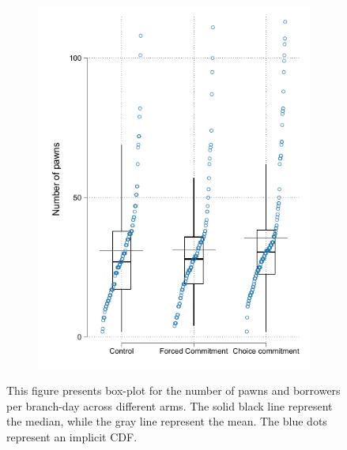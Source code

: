 \begin{figure}[H]
\begin{center}
\begin{subfigure}{0.35\textwidth}
        \includegraphics[width=\textwidth]{Figuras/box_plot_num_pawns.pdf}
    \end{subfigure}
    \end{center}
    \scriptsize
        This figure presents box-plot for the number of pawns and borrowers per branch-day across different arms. The solid black line represent the median, while the gray line represent the mean. The blue dots represent an implicit CDF. 
\end{figure}




